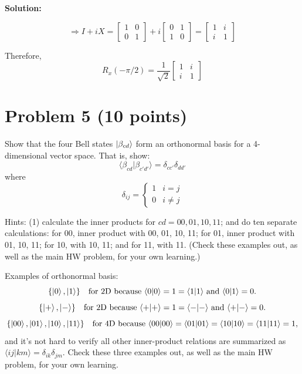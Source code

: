\documentclass[11pt]{article}
\newenvironment{solution}
{\par\noindent\textbf{Solution:}\par}
{\vspace{1em}}
\begin{document}
\begin{solution}
\[
\Rightarrow I + iX = \begin{bmatrix}1&0\\0&1\end{bmatrix} + i\begin{bmatrix}0&1\\1&0\end{bmatrix} = \begin{bmatrix}1& i\\ i& 1\end{bmatrix}
\]

Therefore,
\[
R_x(-\pi/2) = \frac{1}{\sqrt{2}} \begin{bmatrix}1& i\\ i& 1\end{bmatrix}
\]

\end{solution}

\section*{Problem 5 (10 points)}
Show that the four Bell states $\ket{\beta_{cd}}$ form an orthonormal basis for a 4-dimensional vector space. That is, show:
\[
\langle \beta_{cd}|\beta_{c'd'} \rangle = \delta_{cc'}\delta_{dd'}
\]
where
\[
\delta_{ij}=
\begin{cases}
1 & i=j\\
0 & i\neq j
\end{cases}
\]

Hints: (1) calculate the inner products for $cd=00,01,10,11$; and do ten separate calculations: for 00, inner product with 00, 01, 10, 11; for 01, inner product with 01, 10, 11; for 10, with 10, 11; and for 11, with 11. (Check these examples out, as well as the main HW problem, for your own learning.)

Examples of orthonormal basis:
\[
\{\ket{0},\ket{1}\}\quad\text{for 2D because }\langle0|0\rangle=1=\langle1|1\rangle\text{ and }\langle0|1\rangle=0.
\]
\[
\{\ket{+},\ket{-}\}\quad\text{for 2D because }\langle+|+\rangle=1=\langle-|-\rangle\text{ and }\langle+|-\rangle=0.
\]
\[
\{\ket{00},\ket{01},\ket{10},\ket{11}\}\quad\text{for 4D because }\langle00|00\rangle=\langle01|01\rangle=\langle10|10\rangle=\langle11|11\rangle=1,
\]
and it's not hard to verify all other inner-product relations are summarized as $\langle ij|km\rangle = \delta_{ik}\delta_{jm}$. Check these three examples out, as well as the main HW problem, for your own learning.
\end{document}
